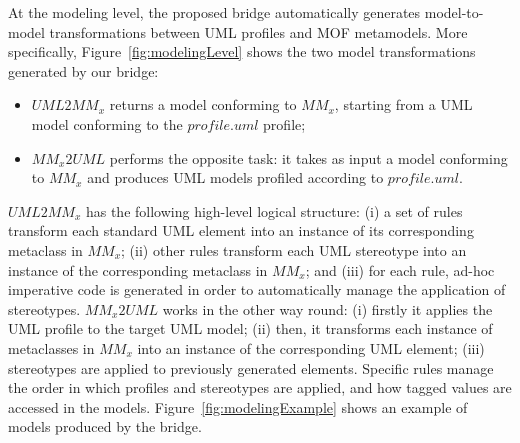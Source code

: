At the modeling level, the proposed bridge automatically generates model-to-model transformations between UML profiles and MOF metamodels.
More specifically, Figure~\ref{fig:modelingLevel} shows the two model transformations generated by our bridge:
%
\begin{itemize}
	\item $UML2MM_x$ returns a model conforming to $MM_x$, starting from a UML model conforming to the $profile.uml$ profile;
	\item $MM_x2UML$ performs the opposite task: it takes as input a model conforming to $MM_x$
	and produces UML models profiled according to $profile.uml$.
\end{itemize}
%
$UML2MM_x$ has the following high-level logical structure: (i) a set of rules transform each standard UML element into an instance of its corresponding metaclass in $MM_x$; (ii) other rules transform each UML stereotype into an instance of the corresponding metaclass in $MM_x$; and (iii) for each rule, ad-hoc imperative code is generated in order to automatically manage the application of stereotypes. $MM_x2UML$ works in the other way round: (i) firstly it applies the UML profile to the target UML model; (ii) then, it transforms each instance of metaclasses in $MM_x$ into an instance of the corresponding UML element; (iii) stereotypes are applied to  previously generated elements. Specific rules manage the order in which profiles and stereotypes are applied, and how tagged values are accessed in the models. Figure~\ref{fig:modelingExample} shows an example of models produced by the bridge.

